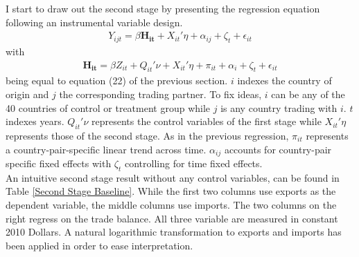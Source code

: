 \documentclass{article}
\begin{document}
I start to draw out the second stage by presenting the regression equation following an instrumental variable design.
\begin{align}
Y_{ijt} =  \beta \mathbf{H_{it}} +  X_{it}'\eta + \alpha_{ij} + \zeta_t + \epsilon_{it}
\end{align}
with 
\begin{align}
\mathbf{H_{it}} =  \beta Z_{it} +  Q_{it}'\nu + X_{it}'\eta + \pi_{it} + \alpha_i + \zeta_t + \epsilon_{it}
\end{align}
being equal to equation (22) of the previous section. $i$ indexes the country of origin and $j$ the corresponding trading partner. To fix ideas, $i$ can be any of the 40 countries of control or treatment group while $j$ is any country trading with $i$. $t$ indexes years. $Q_{it}'\nu$ represents the control variables of the first stage while $X_{it}'\eta$  represents those of the second stage. As in the previous regression, $\pi_{it}$ represents a country-pair-specific linear trend across time. $\alpha_{ij}$ accounts for country-pair specific fixed effects with $\zeta_t$ controlling for time fixed effects. \\
An intuitive second stage result without any control variables, can be found in Table \ref{Second Stage Baseline}. While the first two columns use exports as the dependent variable, the middle columns use imports. The two columns on the right regress on the trade balance. All three variable are measured in constant 2010 Dollars. A natural logarithmic transformation to exports and imports has been applied in order to ease interpretation.
\end{document}
